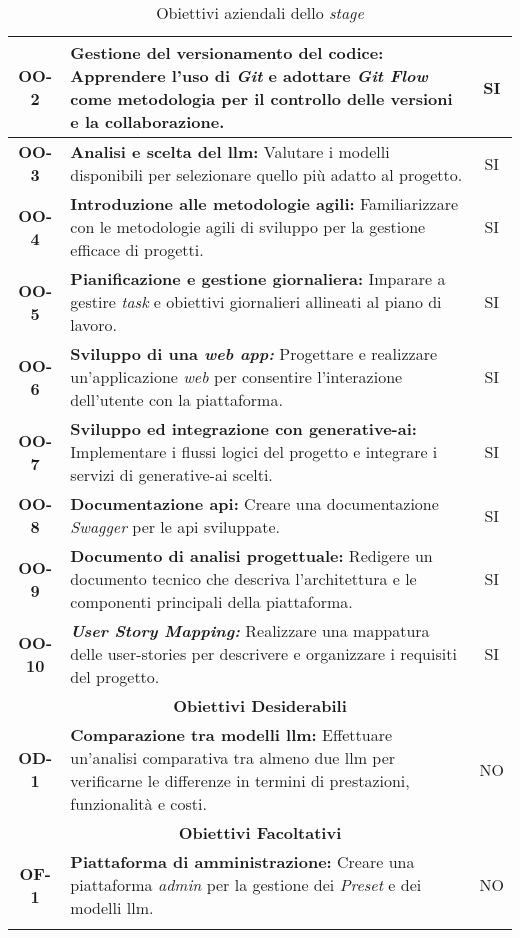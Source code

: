 \begin{longtable}{|c|>{\centering\arraybackslash}p{}|c|}
    \hline
    \textbf{OO-2} & \textbf{Gestione del versionamento del codice:} Apprendere l'uso di \textit{Git} e adottare \textit{Git Flow} come metodologia per il controllo delle versioni e la collaborazione. & SI\\
    \hline
    \textbf{OO-3} & \textbf{Analisi e scelta del \gls{llm}:} Valutare i modelli disponibili per selezionare quello più adatto al progetto.& SI \\
    \hline
    \textbf{OO-4} & \textbf{Introduzione alle metodologie agili:} Familiarizzare con le metodologie agili di sviluppo per la gestione efficace di progetti. & SI\\
    \hline
    \textbf{OO-5} & \textbf{Pianificazione e gestione giornaliera:} Imparare a gestire \textit{task} e obiettivi giornalieri allineati al piano di lavoro. & SI\\
    \hline
    \textbf{OO-6} & \textbf{Sviluppo di una \textit{web app:}} Progettare e realizzare un'applicazione \textit{web} per consentire l'interazione dell'utente con la piattaforma. & SI\\
    \hline
    \textbf{OO-7} & \textbf{Sviluppo ed integrazione con \gls{generative-ai}:} Implementare i flussi logici del progetto e integrare i servizi di \gls{generative-ai} scelti. & SI\\
    \hline
    \textbf{OO-8} & \textbf{Documentazione \gls{api}:} Creare una documentazione \textit{Swagger} per le \gls{api} sviluppate.& SI \\
    \hline
    \textbf{OO-9} & \textbf{Documento di analisi progettuale:} Redigere un documento tecnico che descriva l'architettura e le componenti principali della piattaforma.& SI \\
    \hline
    \textbf{OO-10} & \textbf{\textit{User Story Mapping:}} Realizzare una mappatura delle \gls{user-stories} per descrivere e organizzare i requisiti del progetto.& SI \\
    \hline
    \multicolumn{3}{|c|}{\rowcolor{green!30} \textbf{Obiettivi Desiderabili}} \\
    \hline %
    \textbf{OD-1} & \textbf{Comparazione tra modelli \gls{llm}:} Effettuare un'analisi comparativa tra almeno due \gls{llm} per verificarne le differenze in termini di prestazioni, funzionalità e costi.& NO \\
    \hline
    \multicolumn{3}{|c|}{\rowcolor{green!30} \textbf{Obiettivi Facoltativi}} \\
    \hline %
    \textbf{OF-1} & \textbf{Piattaforma di amministrazione:} Creare una piattaforma \textit{admin} per la gestione dei \textit{Preset} e dei modelli \gls{llm}.& NO \\
    \hline
    \caption{Obiettivi aziendali dello \textit{stage}} %
    \label{tab:raggiungimento_obiettivi_stage} %
\end{longtable}

